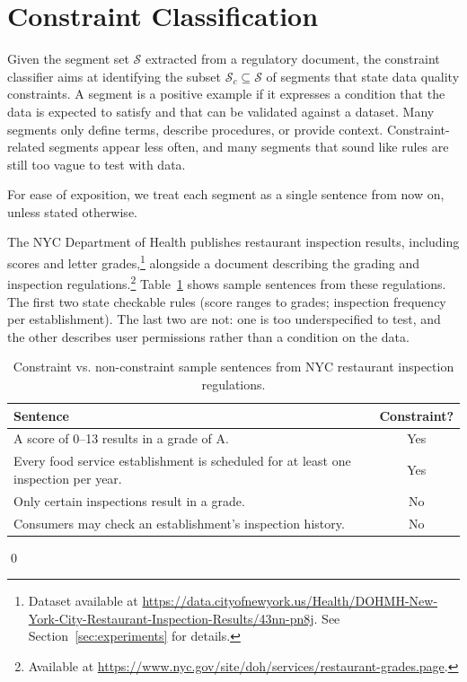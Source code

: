 \section{Constraint Classification}
\label{sec:classifier}
Given the segment set $\mathcal{S}$ extracted from a regulatory document, the constraint classifier aims at identifying the subset $\mathcal{S}_c \subseteq \mathcal{S}$ of segments that state data quality constraints. A segment is a positive example if it expresses a condition that the data is expected to satisfy and that can be 
validated against a dataset. Many segments only define terms, describe procedures, or provide context. Constraint-related segments appear less often, and many segments that sound like rules are still too vague to test with data. 


For ease of exposition, we treat each segment as a single sentence from now on, unless stated otherwise.

\begin{example}
\label{ex:classification}
The NYC Department of Health publishes restaurant inspection results, 
including scores and letter grades,\footnote{Dataset available at 
\url{https://data.cityofnewyork.us/Health/DOHMH-New-York-City-Restaurant-Inspection-Results/43nn-pn8j}. See Section~\ref{sec:experiments} for details.} alongside a document 
describing the grading and inspection regulations.\footnote{Available at 
\url{https://www.nyc.gov/site/doh/services/restaurant-grades.page}.} 
Table~\ref{tab:sentence-types} shows sample sentences from these 
regulations. The first two state checkable rules (score ranges to grades; inspection frequency per establishment). The last two are not: one is too underspecified to test, and the other describes user permissions rather than a condition on the data.
\begin{table}[ht]
\centering
\small
\begin{tabular}{p{}c}
\toprule
\textbf{Sentence} & \textbf{Constraint?} \\
\midrule
A score of 0--13 results in a grade of A. & Yes \\
Every food service establishment is scheduled for at least one inspection per year. & Yes \\
Only certain inspections result in a grade. & No \\
Consumers may check an establishment's inspection history. & No \\
\bottomrule
\end{tabular}
\caption{Constraint vs. non-constraint sample sentences from NYC restaurant inspection regulations.}
\label{tab:sentence-types}
\end{table}
\qed
\end{example}

